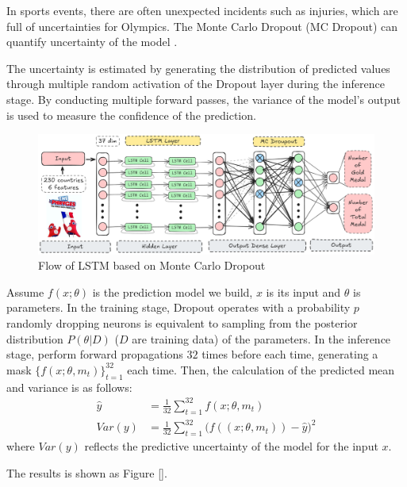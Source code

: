 \documentclass{mcmthesis}
\begin{document}

In sports events, there are often unexpected incidents such as injuries, which are full of uncertainties for Olympics. The Monte Carlo Dropout (MC Dropout) can quantify uncertainty of the model \cite{gal2016dropout}.

The uncertainty is estimated by generating the distribution of predicted values through multiple random activation of the Dropout layer during the inference stage. By conducting multiple forward passes, the variance of the model's output is used to measure the confidence of the prediction.

\begin{figure}
	\centering
	\includegraphics[width=1\linewidth]{fig/LSTM-MCD}
	\caption{Flow of LSTM based on Monte Carlo Dropout}
	\label{fig:lstm-mcd}
\end{figure}


Assume $f(x;\theta)$ is the prediction model we build, $x$ is its input and $\theta$ is parameters. In the training stage, Dropout operates with a probability $p$
randomly dropping neurons is equivalent to sampling from the posterior distribution $P(\theta|D)$ ($D$ are training data) of the parameters. In the inference stage, perform forward propagations $32$ times before each time, generating a mask $\{f(x;\theta,m_t)\}_{t=1}^{32}$ each time. Then, the calculation of the predicted mean and variance is as follows:
\begin{align*}
\hat{y}&=\frac{1}{32} \sum_{t=1}^{32} f(x;\theta,m_t) \\
Var(y) &=\frac{1}{32} \sum_{t=1}^{32} \big( f((x;\theta,m_t)) - \hat{y} \big)^2
\end{align*}
where $Var(y)$ reflects the predictive uncertainty of the model for the input $x$.

The results is shown as Figure \ref{}.
\end{document}
